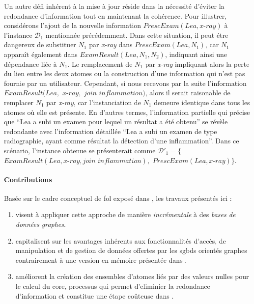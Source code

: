 Un autre défi inhérent à la mise à jour réside dans la nécessité d'éviter la redondance d'information tout en maintenant la cohérence.
Pour illustrer, considérons l'ajout de la nouvelle information $PrescExam(Lea, \textit{x-ray})$ à l'instance $\mathcal{D}_1$ mentionnée précédemment.
Dans cette situation, il peut étre dangereux de substituer $N_1$ par \textit{x-ray} dans $PrescExam(Lea, N_1)$, car $N_1$ apparaît également dans $ExamResult(Lea, N_1, N_2)$, indiquant ainsi une dépendance liée à $N_1$.
Le remplacement de $N_1$ par \textit{x-ray} impliquant alors la perte du lien entre les deux atomes ou la construction d'une information qui n'est pas fournie par un utilisateur.
Cependant, si nous recevons par la suite l'information $ExamResult(Lea,$ $\textit{x-ray},$ $\textit{join inflammation})$, alors il serait raisonable de remplacer $N_1$ par \textit{x-ray}, car l'instanciation de $N_1$ demeure identique dans tous les atomes où elle est présente.
En d'autres termes, l'information partielle qui précise que \enquote{Lea a subi un examen pour lequel un résultat a été obtenu} se révèle redondante avec l'information détaillée \enquote{Lea a subi un examen de type radiographie, ayant comme résultat la détection d'une inflammation}.
Dans ce scénario, l'instance obtenue se présenterait comme $\mathcal{D}'_1 = \{$$ExamResult(Lea, \textit{x-ray}, \textit{join inflammation}),$ $PrescExam(Lea, \textit{x-ray})\}$.

\paragraph{Contributions}
Basée sur le cadre conceptuel de \gls{fol} exposé dans \cite{chabinConsistentUpdatingDatabases2020}, les travaux présentés ici :
\begin{enumerate}
    \item visent à appliquer cette approche de manière \emph{incrémentale} à des \emph{bases de données graphes}.
    \item capitalisent sur les avantages inhérents aux fonctionnalités d'accès, de manipulation et de gestion de données offertes par les \glspl{sgbd} orientés graphes contrairement à une version en mémoire présentée dans \cite{chabinConsistentUpdatingDatabases2020}.
    \item améliorent la création des ensembles d'atomes liés par des valeurs nulles pour le calcul du \gls{core}, processus qui permet d'eliminier la redondance d'information et constitue une étape coûteuse dans \cite{chabinConsistentUpdatingDatabases2020}.
\end{enumerate}


